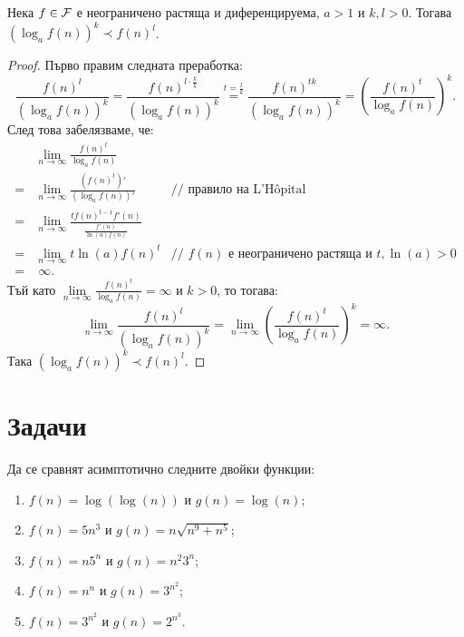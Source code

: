 \begin{claim}
  Нека $f \in \mathcal{F}$ е неограничено растяща и диференцируема, $a > 1$ и $k, l > 0$.
  Тогава $(\log_a f(n))^{k} \prec f(n)^{l}$.
\end{claim}

\begin{proof}
  Първо правим следната преработка:
  \[
    \frac{f(n)^{l}}{(\log_a f(n))^k} = \frac{f(n)^{l \cdot \frac{k}{k}}}{(\log_a f(n))^k} \stackrel{t = \frac{l}{k}}{=} \frac{f(n)^{tk}}{(\log_a f(n))^k} = \left( \frac{f(n)^t}{\log_a f(n)} \right)^k.
  \]
  След това забелязваме, че:
  \begin{align*}
      & \lim\limits_{n \to \infty} \frac{f(n)^t}{\log_a f(n)}                             &                                                                 \\
    = & \lim\limits_{n \to \infty} \frac{(f(n)^t)'}{(\log_a f(n))'}                       & \text{// правило на L'Hôpital}                                  \\
    = & \lim\limits_{n \to \infty} \frac{t f(n)^{t - 1} f'(n)}{\frac{f'(n)}{\ln(a) f(n)}} &                                                                 \\
    = & \lim\limits_{n \to \infty} t \ln(a) f(n)^t                                        & \text{// } f(n) \text{ е неограничено растяща и } t, \ln(a) > 0 \\
    = & \;\infty.                                                                         &
  \end{align*}
  Тъй като $\lim\limits_{n \to \infty} \frac{f(n)^t}{\log_a f(n)} = \infty$ и $k > 0$, то тогава:
  \[
    \lim\limits_{n \to \infty} \frac{f(n)^{l}}{(\log_a f(n))^k} = \lim\limits_{n \to \infty} \left( \frac{f(n)^t}{\log_a f(n)} \right)^k = \infty.
  \]
  Така $(\log_a f(n))^{k} \prec f(n)^{l}$.
\end{proof}

\section{Задачи}

\begin{problem}
Да се сравнят асимптотично следните двойки функции:
\begin{enumerate}
  \item $f(n) = \log(\log(n))$ и $g(n) = \log(n)$;
  \item $f(n) = 5n^3$ и $g(n) = n \sqrt{n^9 + n^5}$;
  \item $f(n) = n 5^n$ и $g(n) = n^ 2 3^n$;
  \item $f(n) = n^n$ и $g(n) = 3^{n^2}$;
  \item $f(n) = 3^{n^2}$ и $g(n) = 2^{n^3}$.
\end{enumerate}
\end{problem}

